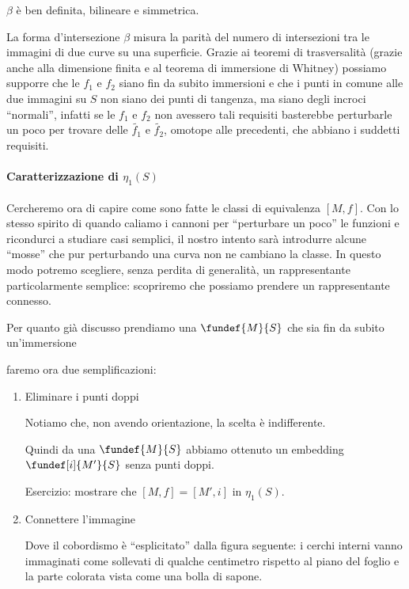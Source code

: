 \begin{ex}
	$\beta$ è ben definita, bilineare e simmetrica.
\end{ex}

La forma d'intersezione $\beta$ misura la parità del numero di intersezioni tra le immagini di due curve su una superficie. Grazie ai teoremi di trasversalità (grazie anche alla dimensione finita e al teorema di immersione di Whitney) possiamo supporre che le $f_1$ e $f_2$ siano fin da subito immersioni e che i punti in comune alle due immagini su $S$ non siano dei punti di tangenza, ma siano degli incroci ``normali'', infatti se le $f_1$ e $f_2$ non avessero tali requisiti basterebbe perturbarle un poco per trovare delle $\tilde{f_1}$ e $\tilde{f_2}$, omotope alle precedenti, che abbiano i suddetti requisiti.

\paragraph{Caratterizzazione di $\eta_1(S)$}
Cercheremo ora di capire come sono fatte le classi di equivalenza $[M,f]$. Con lo stesso spirito di quando caliamo i cannoni per ``perturbare un poco'' le funzioni e ricondurci a studiare casi semplici, il nostro intento sarà introdurre alcune ``mosse'' che pur perturbando una curva non ne cambiano la classe. In questo modo potremo scegliere, senza perdita di generalità, un rappresentante particolarmente semplice: scopriremo che possiamo prendere un rappresentante connesso.

Per quanto già discusso prendiamo una $\fundef{M}{S}$ che sia fin da subito un'immersione
\begin{center}
  
\end{center}
faremo ora due semplificazioni:

\begin{enumerate}
\item Eliminare i punti doppi
\begin{center}
  
\end{center}
Notiamo che, non avendo orientazione, la scelta è indifferente.

Quindi da una $\fundef{M}{S}$ abbiamo ottenuto un embedding $\fundef[i]{M'}{S}$ senza punti doppi.

Esercizio: mostrare che $[M,f] = [M',i]$ in $\eta_1(S)$.

\item Connettere l'immagine
\begin{center}
	\def\svgwidth{11cm}
  
\end{center}
Dove il cobordismo è ``esplicitato'' dalla figura seguente: i cerchi interni vanno immaginati come sollevati di qualche centimetro rispetto al piano del foglio e la parte colorata vista come una bolla di sapone.
\begin{center}
	\def\svgwidth{11cm}
  
\end{center}
\end{enumerate}

